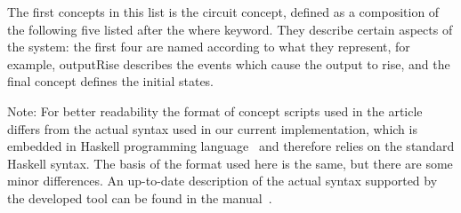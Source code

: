 \documentclass[british,compsoc]{IEEEtran}
\begin{document}
\vspace{3mm}

The first concepts in this list is the \textsf{circuit} concept, defined as a
composition of the following five listed after the \textsf{where} keyword.
They describe certain aspects of the system: the first four are named
according to what they represent, for example, \textsf{outputRise} describes
the events which cause the output to rise, and the final concept defines
the initial states.


Note: For better readability the format of concept scripts used in the article
differs from the actual syntax used in our current implementation, which is
embedded in Haskell programming language~\cite{1996_hudak_dsl} and therefore
relies on the standard Haskell syntax. The basis of the format used here is the
same, but there are some minor differences. An up-to-date description of the
actual syntax supported by the developed tool can be found in the
manual~\cite{2016_concepts_github}.

\end{document}
